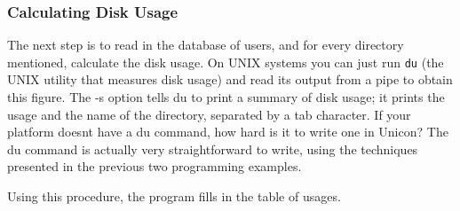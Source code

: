 \subsubsection{Calculating Disk Usage}

The next step is to read in the database of users, and for every
directory mentioned, calculate the disk usage. On
UNIX systems you can just run \texttt{du} (the UNIX utility that
measures disk usage) and read its output from a pipe to obtain this
figure. The \textsf{{}-s} option tells \textsf{du} to print a summary
of disk usage; it prints the usage and the name of the directory,
separated by a tab character. If your platform doesn{\textquotesingle}t
have a \textsf{du} command, how hard is it to write one in Unicon? The
\textsf{du} command is actually very straightforward to write, using
the techniques presented in the previous two programming examples.


Using this procedure, the program fills in the table of usages.


